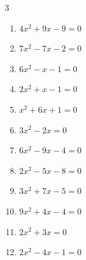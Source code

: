 \begin{multicols}{3}
\begin{enumerate}
\columnbreak %

  \item $4x^{2}+9x-9=0$


  \item $7x^{2}-7x-2=0$


  \item $6x^{2}-x-1=0$


  \item $2x^{2}+x-1=0$


  \item $x^{2}+6x+1=0$


  \item $3x^{2}-2x=0$


  \item $6x^{2}-9x-4=0$


\columnbreak %

\resetques

  \item $2x^{2}-5x-8=0$


  \item $3x^{2}+7x-5=0$


  \item $9x^{2}+4x-4=0$


  \item $2x^{2}+3x=0$


  \item $2x^{2}-4x-1=0$



\end{enumerate}
\end{multicols}
